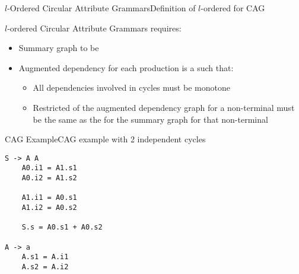 \begin{frame}{$l$-Ordered Circular Attribute Grammars}{Definition of $l$-ordered for CAG}

$l$-ordered Circular Attribute Grammars requires:
\begin{itemize}
    \item Summary graph to be \customorder{}
    \item Augmented dependency for each production is a \customorder{} such that:
    \begin{itemize}
        \item All dependencies involved in cycles must be monotone
        \item Restricted \customorder{} of the augmented dependency graph for a non-terminal must be the same as the \customorder{} for the summary graph for that non-terminal
    \end{itemize}
\end{itemize}


\end{frame}


\begin{frame}[fragile=singleslide]{CAG Example}{CAG example with 2 independent cycles}



\begin{multicols}{2}
\begin{Verbatim}[fontsize=\small]
S -> A A
    A0.i1 = A1.s1
    A0.i2 = A1.s2
 
    A1.i1 = A0.s1
    A1.i2 = A0.s2

    S.s = A0.s1 + A0.s2

A -> a
    A.s1 = A.i1
    A.s2 = A.i2





\end{Verbatim}
\end{multicols}
    
\end{frame}

